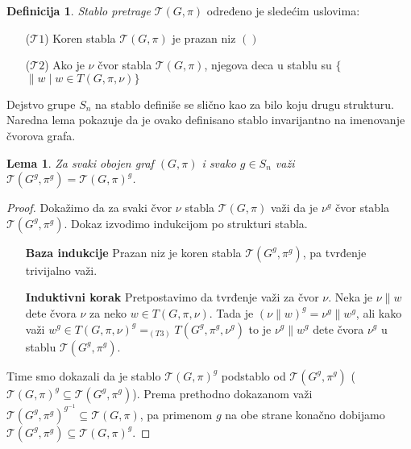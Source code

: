 \documentclass[12pt,oneside]{memoir}
\newtheorem{lemma}{Lema}
\theoremstyle{definition}
\newtheorem*{definition}{Definicija}
\begin{document}
  \begin{definition}
      \emph{Stablo pretrage} $\mathcal{T}(G, \pi)$ određeno je sledećim uslovima:
  
   \begin{itemize}
       \item[($\mathcal{T}1$)] Koren stabla $\mathcal{T}(G, \pi)$ je prazan niz $()$
       \item[($\mathcal{T}2$)] Ako je $\nu$ čvor stabla $\mathcal{T}(G, \pi)$, njegova deca u
     	stablu su $\{$\nu$ \| w \mid w \in T(G, \pi, \nu)\}$
   \end{itemize}
  \end{definition}

  Dejstvo grupe $S_n$ na stablo definiše se slično kao za bilo koju drugu
  strukturu. Naredna lema pokazuje da je ovako definisano stablo invarijantno na
  imenovanje čvorova grafa.

  \begin{lemma}
      Za svaki obojen graf $(G, \pi)$ i svako $g \in S_n$ važi
      $\mathcal{T}(G^g, \pi^g) = \mathcal{T}(G, \pi)^g$.
  \end{lemma}

  \begin{proof}
      Dokažimo da za svaki čvor $\nu$ stabla $\mathcal{T}(G, \pi)$ važi da je
      $\nu^g$ čvor stabla $\mathcal{T}(G^g, \pi^g)$. Dokaz izvodimo indukcijom
      po strukturi stabla.
      \begin{itemize}
     	 \item[] \textbf{Baza indukcije} Prazan niz je koren stabla
     		 $\mathcal{T}(G^g, \pi^g)$, pa tvrđenje trivijalno važi.
     	 \item[] \textbf{Induktivni korak} Pretpostavimo da tvrđenje važi za
     		 čvor $\nu$. Neka je $\nu \| w$ dete čvora $\nu$ za neko $w \in
     		 T(G, \pi, \nu)$. Tada je $(\nu \| w)^g = \nu^g \| w^g$, ali kako
     		 važi $w^g \in T(G, \pi, \nu)^g =_{(T3)} T(G^g, \pi^g, \nu^g)$
     		 to je $\nu^g \| w^g$ dete čvora $\nu^g$ u stablu $\mathcal{T}(G^g,
     		 \pi^g)$.
      \end{itemize}
      Time smo dokazali da je stablo $\mathcal{T}(G, \pi)^g$ podstablo od
      $\mathcal{T}(G^g, \pi^g)$ ($\mathcal{T}(G, \pi)^g \subseteq
      \mathcal{T}(G^g, \pi^g)$). Prema prethodno dokazanom važi
      $\mathcal{T}(G^g, \pi^g)^{g^{-1}} \subseteq \mathcal{T}(G, \pi)$, pa
      primenom $g$ na obe strane konačno dobijamo $\mathcal{T}(G^g, \pi^g)
      \subseteq \mathcal{T}(G, \pi)^g$.
  \end{proof}
\end{document}

